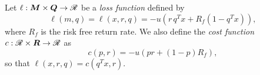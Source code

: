 \documentclass[11pt]{article}
\begin{document}


\begin{deff}
  Let $\ell:\bm M\times \bm Q\to\mathscr{R}$ be a \textsl{loss function} defined by
  \begin{equation*}
    \ell(m,q) = \ell(x,r,q) = -u(r\,q^{T}x + R_f (1 - q^{T}x)),
  \end{equation*}
  where $R_f$ is the risk free return rate. We also define the \textsl{cost function}
  $c:\mathscr{R}\times\bm R\to\mathscr{R}$ as
  \begin{equation*}
    c(p,r) = -u(pr + (1-p)R_f),
  \end{equation*}
  so that $\ell(x,r,q) = c(q^Tx,r)$. 
\end{deff}
\end{document}
